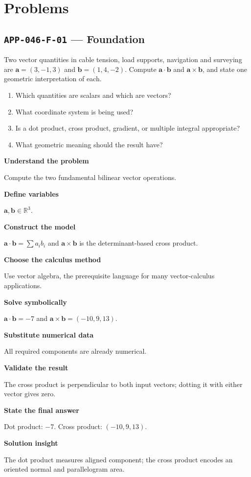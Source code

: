 \documentclass[11pt]{book}
\newcommand{\pid}[1]{\texttt{#1}}
\begin{document}
\section*{Problems}
\subsection*{\pid{APP-046-F-01} — Foundation}
\begin{problembox}
Two vector quantities in cable tension, load supports, navigation and surveying are $\mathbf a=(3,-1,3)$ and $\mathbf b=(1,4,-2)$. Compute $\mathbf a\cdot\mathbf b$ and $\mathbf a\times\mathbf b$, and state one geometric interpretation of each.
\end{problembox}
\begin{promptbox}\begin{enumerate}
\item Which quantities are scalars and which are vectors?
\item What coordinate system is being used?
\item Is a dot product, cross product, gradient, or multiple integral appropriate?
\item What geometric meaning should the result have?
\end{enumerate}\end{promptbox}
\begin{solutionbox}
\textbf{Understand the problem}\par Compute the two fundamental bilinear vector operations.\par\medskip
\textbf{Define variables}\par $\mathbf a,\mathbf b\in\mathbb R^3$.\par\medskip
\textbf{Construct the model}\par $\mathbf a\cdot\mathbf b=\sum a_ib_i$ and $\mathbf a\times\mathbf b$ is the determinant-based cross product.\par\medskip
\textbf{Choose the calculus method}\par Use vector algebra, the prerequisite language for many vector-calculus applications.\par\medskip
\textbf{Solve symbolically}\par $\mathbf a\cdot\mathbf b=-7$ and $\mathbf a\times\mathbf b=(-10,9,13)$.\par\medskip
\textbf{Substitute numerical data}\par All required components are already numerical.\par\medskip
\textbf{Validate the result}\par The cross product is perpendicular to both input vectors; dotting it with either vector gives zero.\par\medskip
\textbf{State the final answer}\par Dot product: $-7$. Cross product: $(-10,9,13)$.\par\medskip
\textbf{Solution insight}\par The dot product measures aligned component; the cross product encodes an oriented normal and parallelogram area.\par\medskip
\end{solutionbox}
\end{document}
